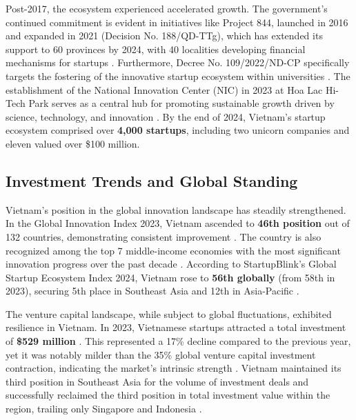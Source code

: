 \documentclass[../Main.tex]{subfiles}%
\begin{document}
	Post-2017, the ecosystem experienced accelerated growth. The government's continued commitment is evident in initiatives like Project 844, launched in 2016 and expanded in 2021 (Decision No. 188/QD-TTg), which has extended its support to 60 provinces by 2024, with 40 localities developing financial mechanisms for startups \cite{nssc2024project}. Furthermore, Decree No. 109/2022/ND-CP specifically targets the fostering of the innovative startup ecosystem within universities \cite{nssc2024project}. The establishment of the National Innovation Center (NIC) in 2023 at Hoa Lac Hi-Tech Park serves as a central hub for promoting sustainable growth driven by science, technology, and innovation \cite{vietnam_innovation_report_2024}. By the end of 2024, Vietnam's startup ecosystem comprised over \textbf{4,000 startups}, including two unicorn companies and eleven valued over \$100 million.

	\subsection{Investment Trends and Global Standing}
	Vietnam's position in the global innovation landscape has steadily strengthened. In the Global Innovation Index 2023, Vietnam ascended to \textbf{46th position} out of 132 countries, demonstrating consistent improvement \cite{vietnam_innovation_report_2024}. The country is also recognized among the top 7 middle-income economies with the most significant innovation progress over the past decade \cite{vietnam_innovation_report_2024}. According to StartupBlink's Global Startup Ecosystem Index 2024, Vietnam rose to \textbf{56th globally} (from 58th in 2023), securing 5th place in Southeast Asia and 12th in Asia-Pacific \cite{startupblink2024, vietnamnews2024pm}.

	The venture capital landscape, while subject to global fluctuations, exhibited resilience in Vietnam. In 2023, Vietnamese startups attracted a total investment of \textbf{\$529 million} \cite{vietnam_innovation_report_2024}. This represented a 17\% decline compared to the previous year, yet it was notably milder than the 35\% global venture capital investment contraction, indicating the market's intrinsic strength \cite{vietnam_innovation_report_2024}. Vietnam maintained its third position in Southeast Asia for the volume of investment deals and successfully reclaimed the third position in total investment value within the region, trailing only Singapore and Indonesia \cite{vietnam_innovation_report_2024}.
\end{document}
